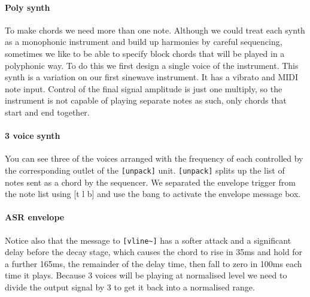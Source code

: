 \paragraph{Poly synth}
To make chords we need more than one note. Although we could treat
each synth as a monophonic instrument and build up harmonies by
careful sequencing, sometimes we like to be able to specify block
chords that will be played in a polyphonic way. To do this we first
design a single voice of the instrument. This synth is a variation
on our first sinewave instrument. It has a vibrato
and MIDI note input. Control of the final signal amplitude is
just one multiply, so the instrument is not capable of playing 
separate notes as such, only chords that start and end together.


\paragraph{3 voice synth}
You can see three of the voices arranged with the frequency of each controlled
by the corresponding outlet of the \verb+[unpack]+ unit. \verb+[unpack]+ splits up the list of notes sent
as a chord by the sequencer. We separated the envelope trigger
from the note list using [t l b] and use the bang to
activate the envelope message box. 


\paragraph{ASR envelope}
Notice also that the message to \verb+[vline~]+ has a softer attack
and a significant delay before the decay stage, which
causes the chord to rise in 35ms and hold for a further 165ms, the remainder 
of the delay time, then fall to zero in 100ms each time it
plays. Because 3 voices will be playing at normalised level we need to
divide the output signal by 3 to get it back into a normalised range.